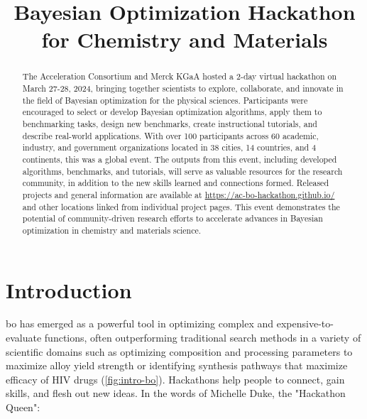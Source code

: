 \documentclass[superscriptaddress, nofootinbib,  amsmath, amssymb, twocolumn]{revtex4-2} %
\begin{document}
\title{Bayesian Optimization Hackathon for Chemistry and Materials}

% 





\begin{abstract}
The Acceleration Consortium and Merck KGaA hosted a 2-day virtual hackathon on March 27-28, 2024, bringing together scientists to explore, collaborate, and innovate in the field of Bayesian optimization for the physical sciences. Participants were encouraged to select or develop Bayesian optimization algorithms, apply them to benchmarking tasks, design new benchmarks, create instructional tutorials, and describe real-world applications. With over 100 participants across 60 academic, industry, and government organizations located in 38 cities, 14 countries, and 4 continents, this was a global event. %
The outputs from this event, including developed algorithms, benchmarks, and tutorials, will serve as valuable resources for the research community, in addition to the new skills learned and connections formed. Released projects and general information are available at \url{https://ac-bo-hackathon.github.io/} and other locations linked from individual project pages. This event demonstrates the potential of community-driven research efforts to accelerate advances in Bayesian optimization in chemistry and materials science.
\end{abstract}

\maketitle





\section{Introduction}

\Gls{bo} has emerged as a powerful tool in optimizing complex and expensive-to-evaluate functions, often outperforming traditional search methods in a variety of scientific domains such as optimizing composition and processing parameters to maximize alloy yield strength or identifying synthesis pathways that maximize efficacy of HIV drugs (\cref{fig:intro-bo}). Hackathons help people to connect, gain skills, and flesh out new ideas. In the words of Michelle Duke, the "Hackathon Queen":
\end{document}
